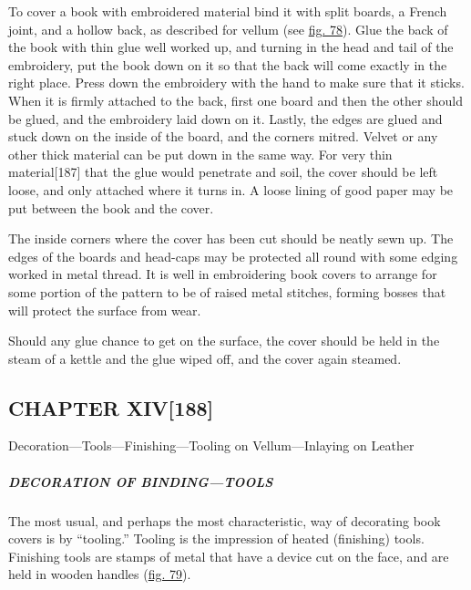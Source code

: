 \documentclass[
]{article}
\begin{document}
To cover a book with embroidered material bind it with split boards, a
French joint, and a hollow back, as described for vellum (see
\protect\hyperlink{Fig_78}{fig. 78}). Glue the back of the book with
thin glue well worked up, and turning in the head and tail of the
embroidery, put the book down on it so that the back will come exactly
in the right place. Press down the embroidery with the hand to make sure
that it sticks. When it is firmly attached to the back, first one board
and then the other should be glued, and the embroidery laid down on it.
Lastly, the edges are glued and stuck down on the inside of the board,
and the corners mitred. Velvet or any other thick material can be put
down in the same way. For very thin
material{\protect\hypertarget{Page_187}{}{{[}187{]}}} that the glue
would penetrate and soil, the cover should be left loose, and only
attached where it turns in. A loose lining of good paper may be put
between the book and the cover.

The inside corners where the cover has been cut should be neatly sewn
up. The edges of the boards and head-caps may be protected all round
with some edging worked in metal thread. It is well in embroidering book
covers to arrange for some portion of the pattern to be of raised metal
stitches, forming bosses that will protect the surface from wear.

Should any glue chance to get on the surface, the cover should be held
in the steam of a kettle and the glue wiped off, and the cover again
steamed.

\hypertarget{chapter-xiv188}{%
\subsection[CHAPTER
XIV]{\texorpdfstring{\protect\hypertarget{CHAPTER_XIV}{}{}CHAPTER
XIV{\protect\hypertarget{Page_188}{}{{[}188{]}}}}{CHAPTER XIV{[}188{]}}}\label{chapter-xiv188}}

Decoration---Tools---Finishing---Tooling on Vellum---Inlaying on Leather

\hypertarget{decoration-of-bindingtools}{%
\subparagraph{DECORATION OF
BINDING---TOOLS}\label{decoration-of-bindingtools}}

{The} most usual, and perhaps the most characteristic, way of decorating
book covers is by ``tooling.'' Tooling is the impression of heated
(finishing) tools. Finishing tools are stamps of metal that have a
device cut on the face, and are held in wooden handles
(\protect\hyperlink{Fig_79}{fig. 79}).
\end{document}
